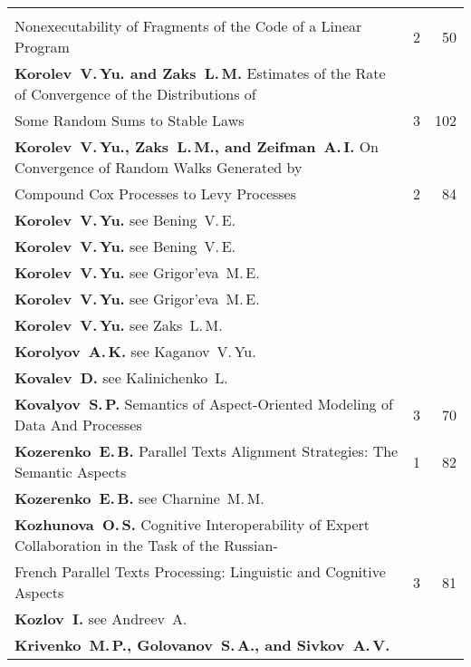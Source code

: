{\begin{tabular}{p{397pt}rr}
\vspace*{-12pt}\\
\hspace*{23pt}Nonexecutability of Fragments of the Code of a Linear Program\dotfill&2&50\\
\textbf{Korolev~V.\,Yu. and Zaks~L.\,M.}
Estimates of the Rate of Convergence of the Distributions of\linebreak
\vspace*{-12pt}\\
\hspace*{23pt}Some Random Sums to Stable Laws\dotfill&3&102\\
\textbf{Korolev~V.\,Yu., Zaks~L.\,M., and Zeifman~A.\,I.}
On Convergence of Random Walks Generated by\linebreak
\vspace*{-12pt}\\
\hspace*{23pt}Compound Cox Processes to Levy Processes\dotfill&2&84\\
\textbf{Korolev~V.\,Yu.} see Bening~V.\,E.&&\\
\textbf{Korolev~V.\,Yu.} see Bening~V.\,E.&&\\
\textbf{Korolev~V.\,Yu.} see Grigor'eva~M.\,E.&&\\
\textbf{Korolev~V.\,Yu.} see Grigor'eva~M.\,E.&&\\
\textbf{Korolev~V.\,Yu.} see Zaks~L.\,M.&&\\
\textbf{Korolyov~A.\,K.} see Kaganov~V.\,Yu.&&\\
\textbf{Kovalev~D.} see Kalinichenko~L.&&\\
\textbf{Kovalyov~S.\,P.}
Semantics of Aspect-Oriented Modeling of Data And Processes\dotfill&3&70\\
\textbf{Kozerenko~E.\,B.}
Parallel Texts Alignment Strategies: The Semantic Aspects\dotfill&1&82\\
\textbf{Kozerenko~E.\,B.} see Charnine~M.\,M.&&\\
\textbf{Kozhunova~O.\,S.}
Cognitive Interoperability of Expert Collaboration in the Task of the Russian-\linebreak
\vspace*{-12pt}\\
\hspace*{23pt}French Parallel Texts Processing:
Linguistic and Cognitive Aspects\dotfill&3&81\\
\textbf{Kozlov~I.} see Andreev~A.&&\\
\textbf{Krivenko~M.\,P., Golovanov~S.\,A., and Sivkov~A.\,V.}

\end{tabular}}
